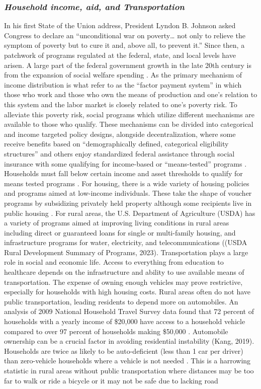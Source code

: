 \subsubsection{\textit{Household income, aid, and Transportation }}
In his first State of the Union address, President Lyndon B. Johnson asked Congress to declare an “unconditional war on poverty… not only to relieve the symptom of poverty but to cure it and, above all, to prevent it.” Since then, a patchwork of programs regulated at the federal, state, and local levels have arisen. A large part of the federal government growth in the late 20th century is from the expansion of social welfare spending \citep{fishback_social_2020}. As the primary mechanism of income distribution is what \citet{berkowitz_gaps_2023} refer to as the “factor payment system” in which those who work and those who own the means of production and one’s relation to this system and the labor market is closely related to one’s poverty risk. To alleviate this poverty risk, social programs which utilize different mechanisms are available to those who qualify. These mechanisms can be divided into categorical and income targeted policy designs, alongside decentralization, where some receive benefits based on “demographically defined, categorical eligibility structures” and others enjoy standardized federal assistance through social insurance with some qualifying for income-based or “means-tested” programs \citep{bruch_poverty_2023}. Households must fall below certain income and asset thresholds to qualify for means tested programs \citep{rank_welfare_2002}. For housing, there is a wide variety of housing policies and programs aimed at low-income individuals. These take the shape of voucher programs by subsidizing privately held property although some recipients live in public housing \citep{kim_housing_2017}. For rural areas, the U.S. Department of Agriculture (USDA) has a variety of programs aimed at improving living conditions in rural areas including direct or guaranteed loans for single or multi-family housing, and infrastructure programs for water, electricity, and telecommunications ((USDA Rural Development Summary of Programs, 2023). Transportation plays a large role in social and economic life. Access to everything from education to healthcare depends on the infrastructure and ability to use available means of transportation. The expense of owning enough vehicles may prove restrictive, especially for households with high housing costs. Rural areas often do not have public transportation, leading residents to depend more on automobiles. An analysis of 2009 National Household Travel Survey data found that 72 percent of households with a yearly income of \$20,000 have access to a household vehicle compared to over 97 percent of households making \$50,000 \citep{blumenberg_automobile_2012}. Automobile ownership can be a crucial factor in avoiding residential instability (Kang, 2019). Households are twice as likely to be auto-deficient (less than 1 car per driver) than zero-vehicle households where a vehicle is not needed \citep{blumenberg_car-deficit_2020}. This is a harrowing statistic in rural areas without public transportation where distances may be too far to walk or ride a bicycle or it may not be safe due to lacking road 